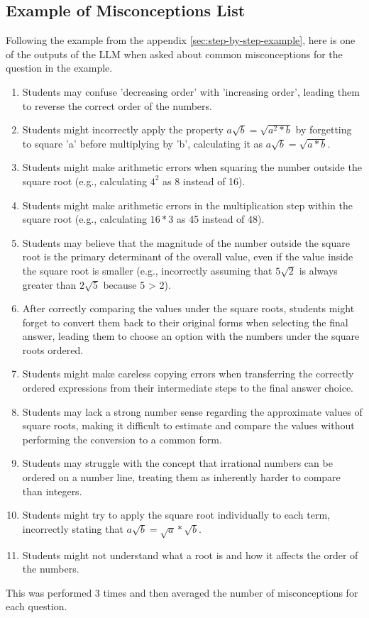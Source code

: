 \documentclass[11pt]{article}
\begin{document}
\subsection{Example of Misconceptions List}
Following the example from the appendix \ref{sec:step-by-step-example}, here is one of the outputs of the LLM when asked about common misconceptions for the question in the example.

\begin{enumerate} %
    \item Students may confuse 'decreasing order' with 'increasing order', leading them to reverse the correct order of the numbers.
    \item Students might incorrectly apply the property $a\sqrt{b} = \sqrt{a^2 * b}$ by forgetting to square 'a' before multiplying by 'b', calculating it as $a\sqrt{b} = \sqrt{a * b}$.
    \item Students might make arithmetic errors when squaring the number outside the square root (e.g., calculating $4^2$ as 8 instead of 16).
    \item Students might make arithmetic errors in the multiplication step within the square root (e.g., calculating $16 * 3$ as 45 instead of 48).
    \item Students may believe that the magnitude of the number outside the square root is the primary determinant of the overall value, even if the value inside the square root is smaller (e.g., incorrectly assuming that $5\sqrt{2}$ is always greater than $2\sqrt{5}$ because 5 > 2).
    \item After correctly comparing the values under the square roots, students might forget to convert them back to their original forms when selecting the final answer, leading them to choose an option with the numbers under the square roots ordered.
    \item Students might make careless copying errors when transferring the correctly ordered expressions from their intermediate steps to the final answer choice.
    \item Students may lack a strong number sense regarding the approximate values of square roots, making it difficult to estimate and compare the values without performing the conversion to a common form.
    \item Students may struggle with the concept that irrational numbers can be ordered on a number line, treating them as inherently harder to compare than integers.
    \item Students might try to apply the square root individually to each term, incorrectly stating that $a\sqrt{b} = \sqrt{a} * \sqrt{b}$.
    \item Students might not understand what a root is and how it affects the order of the numbers.
\end{enumerate}

This was performed 3 times and then averaged the number of misconceptions for each question.
\end{document}
